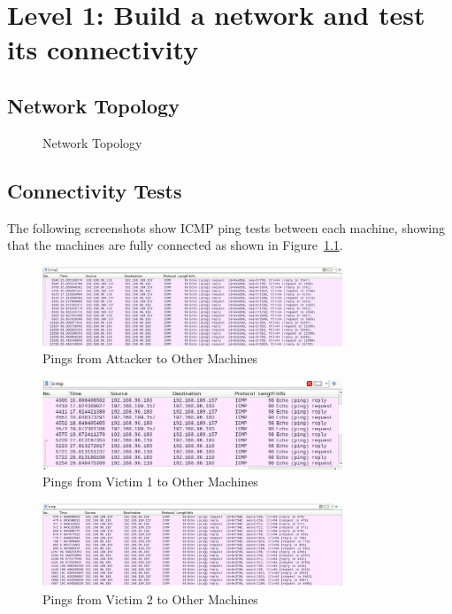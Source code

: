 \chapter{Level 1: Build a network and test its connectivity}

\section{Network Topology}

\begin{figure}[H]
    \centering
    \caption{Network Topology}\label{fig:NetworkTopology}
\end{figure}

\section{Connectivity Tests}

The following screenshots show ICMP ping tests between each machine, showing that the machines are fully connected as shown in Figure~\ref{fig:NetworkTopology}.

\begin{figure}[H]
    \centering
    \includegraphics[width=0.8\textwidth]{img/level1/level1-192-168-96-110.png}
    \caption{Pings from Attacker to Other Machines}\label{fig:PingAttacker}
\end{figure}

\begin{figure}[H]
    \centering
    \includegraphics[width=0.8\textwidth]{img/level1/level1-192-168-96-183.png}
    \caption{Pings from Victim 1 to Other Machines}\label{fig:PingVictim1}
\end{figure}

\begin{figure}[H]
    \centering
    \includegraphics[width=0.8\textwidth]{img/level1/level1-192-168-109-157.png}
    \caption{Pings from Victim 2 to Other Machines}\label{fig:PingVictim2}
\end{figure}